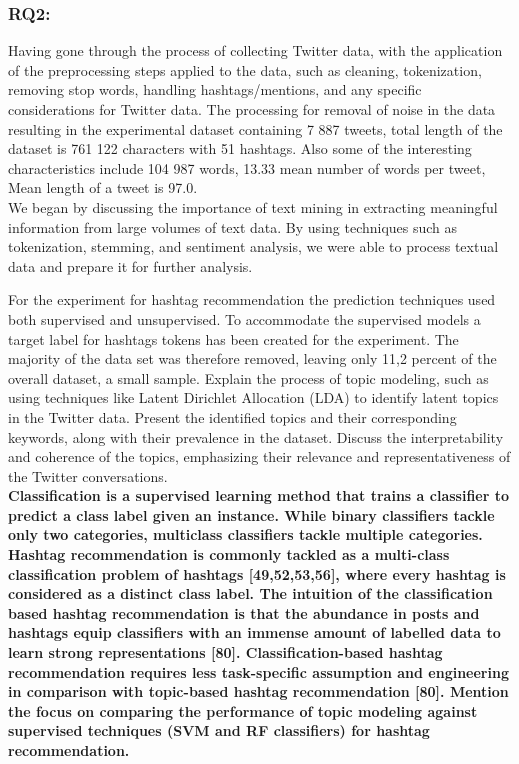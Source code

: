 \subsubsection{RQ2:}

Having gone through the process of collecting Twitter data, 
with the application of the preprocessing steps applied to the data, such as cleaning, tokenization, removing stop words, handling hashtags/mentions, and any specific considerations for Twitter data.
The processing for removal of noise in the data resulting in the experimental dataset containing 7 887 tweets, total length of the dataset is 761 122 characters with 51 hashtags.  Also some of the interesting characteristics include 104 987 words, 13.33 mean number of words per tweet, Mean length of a tweet is 97.0.\\

We began by discussing the importance of text mining in extracting meaningful information from large volumes of text data. By using techniques such as tokenization, stemming, and sentiment analysis, we were able to process textual data and prepare it for further analysis.

For the experiment for hashtag recommendation the prediction techniques used both supervised and unsupervised.  To accommodate the supervised models a target label for hashtags tokens has been  created for the experiment.  The majority of the data set was therefore removed, leaving only 11,2 percent of the overall dataset, a small sample.  Explain the process of topic modeling, such as using techniques like Latent Dirichlet Allocation (LDA) to identify latent topics in the Twitter data.
Present the identified topics and their corresponding keywords, along with their prevalence in the dataset.
Discuss the interpretability and coherence of the topics, emphasizing their relevance and representativeness of the Twitter conversations.\\

\textbf{Classification is a supervised learning method that trains a classifier to predict a class label given an instance. While binary classifiers tackle only two categories, multiclass classifiers tackle multiple categories. Hashtag recommendation is commonly tackled as a multi-class classification problem of hashtags [49,52,53,56], where every hashtag is considered as a distinct class label. The intuition of the classification based hashtag recommendation is that the abundance in posts and hashtags equip classifiers with an immense amount of labelled data to learn strong representations [80]. Classification-based hashtag recommendation requires less task-specific assumption and engineering in comparison with topic-based hashtag recommendation [80].
Mention the focus on comparing the performance of topic modeling against supervised techniques (SVM and RF classifiers) for hashtag recommendation.\\}

